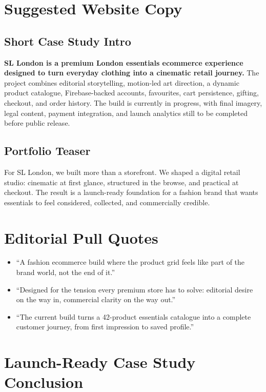 \documentclass[11pt,a4paper]{article}
\newcommand{\project}{SL London}
\begin{document}
\section{Suggested Website Copy}

\subsection{Short Case Study Intro}

\textbf{\project{} is a premium London essentials ecommerce experience designed to turn everyday clothing into a cinematic retail journey.} The project combines editorial storytelling, motion-led art direction, a dynamic product catalogue, Firebase-backed accounts, favourites, cart persistence, gifting, checkout, and order history. The build is currently in progress, with final imagery, legal content, payment integration, and launch analytics still to be completed before public release.

\subsection{Portfolio Teaser}

For \project{}, we built more than a storefront. We shaped a digital retail studio: cinematic at first glance, structured in the browse, and practical at checkout. The result is a launch-ready foundation for a fashion brand that wants essentials to feel considered, collected, and commercially credible.

\section{Editorial Pull Quotes}

\begin{itemize}
    \item ``A fashion ecommerce build where the product grid feels like part of the brand world, not the end of it.''
    \item ``Designed for the tension every premium store has to solve: editorial desire on the way in, commercial clarity on the way out.''
    \item ``The current build turns a 42-product essentials catalogue into a complete customer journey, from first impression to saved profile.''
\end{itemize}

\section{Launch-Ready Case Study Conclusion}
\end{document}
